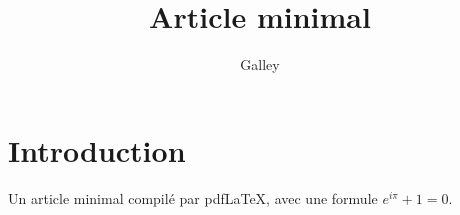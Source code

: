 \documentclass{article}
\title{Article minimal}
\author{Galley}
\begin{document}
\maketitle
\section{Introduction}
Un article minimal compilé par pdf\LaTeX{}, avec une formule $e^{i\pi} + 1 = 0$.
\end{document}
